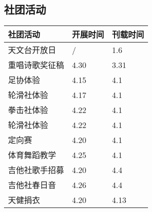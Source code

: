 \documentclass[letterpaper, 12pt]{article}
\begin{document}
\begin{multicols}{2}
\section{社团活动}
\begin{tabular}{|>{\centering\arraybackslash}m{}|m{}|m{}|}
    \hline
    社团活动 & 开展时间 & 刊载时间\\
    \hline\hline
    天文台开放日 & / & 1.6\\
    重唱诗歌奖征稿 & 4.30 & 3.31\\
    足协体验 & 4.15 & 4.1\\
    轮滑社体验 & 4.17 & 4.1\\
    拳击社体验 & 4.22 & 4.1\\
    轮滑社体验 & 4.22 & 4.1\\
    定向赛 & 4.20 & 4.1\\
    体育舞蹈教学 & 4.25 & 4.1\\
    吉他社歌手招募 & 4.20 & 4.4\\
    吉他社春日音 & 4.26 & 4.4\\
    天健捐衣 & 4.20 & 4.13\\
    \hline
\end{tabular}


\end{multicols}
\end{document}
